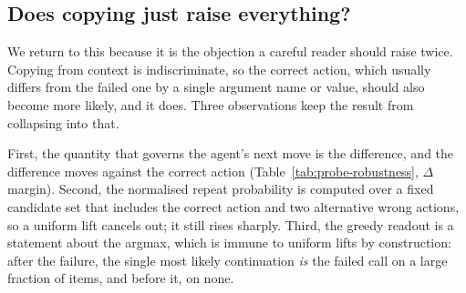 \subsection{Does copying just raise everything?}

We return to this because it is the objection a careful reader should raise
twice. Copying from context is indiscriminate, so the correct action, which usually differs from the failed one by a single
argument name or value, should also become more likely, and it does. Three observations keep the result from
collapsing into that.

First, the quantity that governs the agent's next move is the difference, and
the difference moves against the correct action
(Table~\ref{tab:probe-robustness}, $\Delta$margin). Second, the normalised
repeat probability is computed over a fixed candidate set that includes the
correct action and two alternative wrong actions, so a uniform lift cancels out;
it still rises sharply. Third, the greedy readout is a statement about the
argmax, which is immune to uniform lifts by construction: after the failure, the
single most likely continuation \emph{is} the failed call on a large fraction of
items, and before it, on none.
